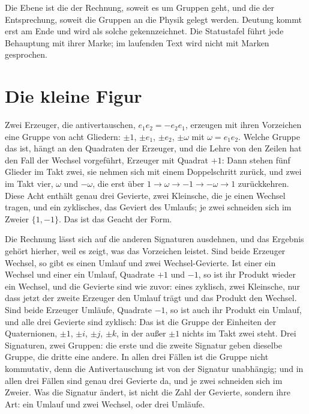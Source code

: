 \documentclass[11pt,a4paper]{article}
\begin{document}
Die Ebene ist die der Rechnung, soweit es um Gruppen geht, und die der Entsprechung, soweit die Gruppen an die Physik gelegt werden. Deutung kommt erst am Ende und wird als solche gekennzeichnet. Die Statustafel führt jede Behauptung mit ihrer Marke; im laufenden Text wird nicht mit Marken gesprochen.

\section{Die kleine Figur}
\label{sec:klein}

Zwei Erzeuger, die antivertauschen, $e_1e_2=-e_2e_1$, erzeugen mit ihren Vorzeichen eine Gruppe von acht Gliedern: $\pm1$, $\pm e_1$, $\pm e_2$, $\pm\omega$ mit $\omega=e_1e_2$. Welche Gruppe das ist, hängt an den Quadraten der Erzeuger, und die Lehre von den Zeilen hat den Fall der Wechsel vorgeführt, Erzeuger mit Quadrat $+1$: Dann stehen fünf Glieder im Takt zwei, sie nehmen sich mit einem Doppelschritt zurück, und zwei im Takt vier, $\omega$ und $-\omega$, die erst über $1\to\omega\to-1\to-\omega\to1$ zurückkehren. Diese Acht enthält genau drei Gevierte, zwei Kleinsche, die je einen Wechsel tragen, und ein zyklisches, das Geviert des Umlaufs; je zwei schneiden sich im Zweier $\{1,-1\}$. Das ist das Geacht der Form.

Die Rechnung lässt sich auf die anderen Signaturen ausdehnen, und das Ergebnis gehört hierher, weil es zeigt, was das Vorzeichen leistet. Sind beide Erzeuger Wechsel, so gibt es einen Umlauf und zwei Wechsel-Gevierte. Ist einer ein Wechsel und einer ein Umlauf, Quadrate $+1$ und $-1$, so ist ihr Produkt wieder ein Wechsel, und die Gevierte sind wie zuvor: eines zyklisch, zwei Kleinsche, nur dass jetzt der zweite Erzeuger den Umlauf trägt und das Produkt den Wechsel. Sind beide Erzeuger Umläufe, Quadrate $-1$, so ist auch ihr Produkt ein Umlauf, und alle drei Gevierte sind zyklisch: Das ist die Gruppe der Einheiten der Quaternionen, $\pm1$, $\pm i$, $\pm j$, $\pm k$, in der außer $\pm1$ nichts im Takt zwei steht. Drei Signaturen, zwei Gruppen: die erste und die zweite Signatur geben dieselbe Gruppe, die dritte eine andere. In allen drei Fällen ist die Gruppe nicht kommutativ, denn die Antivertauschung ist von der Signatur unabhängig; und in allen drei Fällen sind genau drei Gevierte da, und je zwei schneiden sich im Zweier. Was die Signatur ändert, ist nicht die Zahl der Gevierte, sondern ihre Art: ein Umlauf und zwei Wechsel, oder drei Umläufe.
\end{document}

